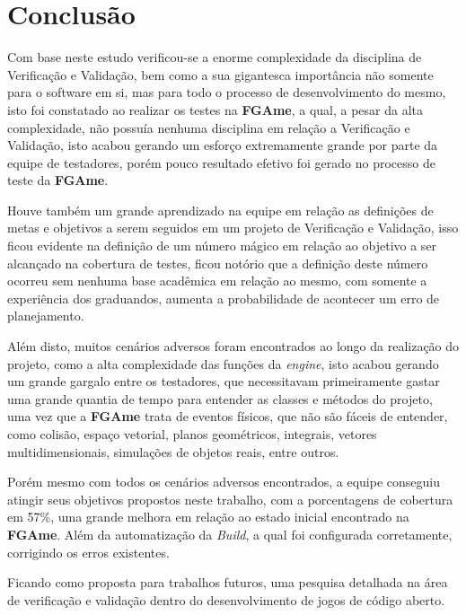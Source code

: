 \chapter{Conclusão}

Com base neste estudo verificou-se a enorme complexidade da disciplina de Verificação e Validação, bem como a sua gigantesca importância não somente para o software em si, mas para todo o processo de desenvolvimento do mesmo, isto foi constatado ao realizar os testes na \textbf{FGAme}, a qual, a pesar da alta complexidade, não possuía nenhuma disciplina em relação a Verificação e Validação, isto acabou gerando um esforço extremamente grande por parte da equipe de testadores, porém pouco resultado efetivo foi gerado no processo de teste da \textbf{FGAme}.

Houve também um grande aprendizado na equipe em relação as definições de metas e objetivos a serem seguidos em um projeto de Verificação e Validação, isso ficou evidente na definição de um número mágico em relação ao objetivo a ser alcançado na cobertura de testes, ficou notório que a definição deste número ocorreu sem nenhuma base acadêmica em relação ao mesmo, com somente a experiência dos graduandos, aumenta a probabilidade de acontecer um erro de planejamento.

Além disto, muitos cenários adversos foram encontrados ao longo da realização do projeto, como a alta complexidade das funções da \textit{engine}, isto acabou gerando um grande gargalo entre os testadores, que necessitavam primeiramente gastar uma grande quantia de tempo para entender as classes e métodos do projeto, uma vez que a \textbf{FGAme} trata de eventos físicos, que não são fáceis de entender, como colisão, espaço vetorial, planos geométricos, integrais, vetores multidimensionais, simulações de objetos reais, entre outros.

Porém mesmo com todos os cenários adversos encontrados, a equipe conseguiu atingir seus objetivos propostos neste trabalho, com a porcentagens de cobertura em 57\%, uma grande melhora em relação ao estado inicial encontrado na \textbf{FGAme}. Além da automatização da \textit{Build}, a qual foi configurada corretamente, corrigindo os erros existentes. 

Ficando como proposta para trabalhos futuros, uma pesquisa detalhada na área de verificação e validação dentro do desenvolvimento de jogos de código aberto.
